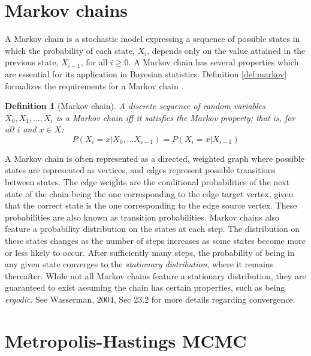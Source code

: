 \documentclass[
  12pt,
  twoside]{book}
\theoremstyle{definition}
\newtheorem{definition}{Definition}[chapter]
\theoremstyle{definition}
\theoremstyle{definition}
\theoremstyle{remark}
\begin{document}
\hypertarget{markov-chains}{%
\section{Markov chains}\label{markov-chains}}

A Markov chain is a stochastic model expressing a sequence of possible states in which the probability of each state, \(X_{i}\), depends only on the value attained in the previous state, \(X_{i-1}\), for all \(i \geq 0\).
A Markov chain has several properties which are essential for its application in Bayesian statistics.
Definition \ref{def:markov} formalizes the requirements for a Markov chain \citep[  23.2]{Wasserman2004}.

\begin{definition}[Markov chain]
\protect\hypertarget{def:markov}{}{\label{def:markov} {} }\emph{A discrete sequence of random variables \({X_{0},X_{1},...,X_{i}}\) is a Markov chain iff it satisfies the Markov property; that is, for all \(i\) and \(x \in X\):}
\[P(X_{i}=x|X_{0},...X_{i-1})=P(X_{i}=x|X_{i-1})\]
\end{definition}

A Markov chain is often represented as a directed, weighted graph where possible states are represented as vertices, and edges represent possible transitions between states. The edge weights are the conditional probabilities of the next state of the chain being the one corresponding to the edge target vertex, given that the correct state is the one corresponding to the edge source vertex.
These probabilities are also known as transition probabilities.
Markov chains also feature a probability distribution on the states at each step.
The distribution on these states changes as the number of steps increases as some states become more or less likely to occur.
After sufficiently many steps, the probability of being in any given state converges to the \emph{stationary distribution}, where it remains thereafter.
While not all Markov chains feature a stationary distribution, they are guaranteed to exist assuming the chain has certain properties, such as being \emph{ergodic}.
See Wasserman, 2004, Sec 23.2 for more details regarding convergence.

\hypertarget{metropolis-hastings-mcmc}{%
\section{Metropolis-Hastings MCMC}\label{metropolis-hastings-mcmc}}
\end{document}
